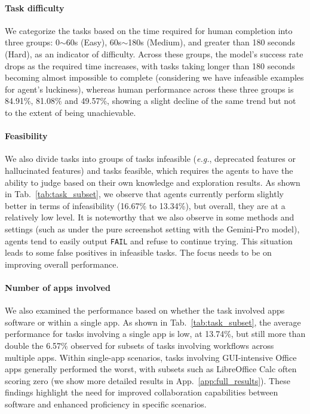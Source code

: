 \paragraph{Task difficulty}
We categorize the tasks based on the time required for human completion into three groups: 0$\sim$60s (Easy), 60s$\sim$180s (Medium), and greater than 180 seconds (Hard), as an indicator of difficulty. 
Across these groups, the model's success rate drops as the required time increases, with tasks taking longer than 180 seconds becoming almost impossible to complete (considering we have infeasible examples for agent's luckiness), whereas human performance across these three groups is 84.91\%, 81.08\% and 49.57\%, showing a slight decline of the same trend but not to the extent of being unachievable.

\paragraph{Feasibility}
We also divide tasks into groups of tasks infeasible (\textit{e.g.}, deprecated features or hallucinated features) and tasks feasible, which requires the agents to have the ability to judge based on their own knowledge and exploration results.
As shown in Tab.~\ref{tab:task_subset}, we observe that agents currently perform slightly better in terms of infeasibility (16.67\% to 13.34\%), but overall, they are at a relatively low level. 
It is noteworthy that we also observe in some methods and settings (such as under the pure screenshot setting with the Gemini-Pro model), agents tend to easily output \texttt{FAIL} and refuse to continue trying. 
This situation leads to some false positives in infeasible tasks.
The focus needs to be on improving overall performance.



\paragraph{Number of apps involved}
We also examined the performance based on whether the task involved apps software or within a single app. 
As shown in Tab.~\ref{tab:task_subset}, the average performance for tasks involving a single app is low, at 13.74\%, but still more than double the 6.57\% observed for subsets of tasks involving workflows across multiple apps. 
Within single-app scenarios, tasks involving GUI-intensive Office apps generally performed the worst, with subsets such as LibreOffice Calc often scoring zero (we show more detailed results in App.~\ref{app:full_results}).
These findings highlight the need for improved collaboration capabilities between software and enhanced proficiency in specific scenarios.



